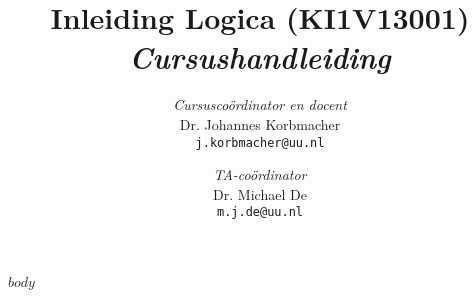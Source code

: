 \documentclass[a4paper,11pt]{article}
\title{Inleiding Logica (KI1V13001) \\[2ex] \emph{Cursushandleiding}}
\author{\emph{Cursuscoördinator en docent}\\[1ex]Dr. Johannes Korbmacher\\ \texttt{j.korbmacher@uu.nl} \and \emph{TA-coördinator}\\[1ex] Dr. Michael De\\ \texttt{m.j.de@uu.nl}}
\begin{document}
\maketitle
\thispagestyle{empty}
$body$
\end{document}
